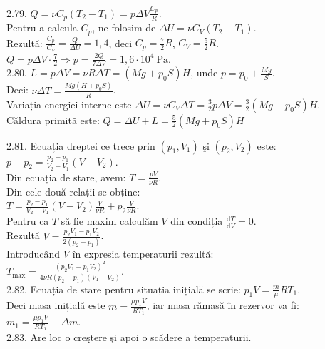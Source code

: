 2.79. $Q=\nu C_{p}\left(T_{2}-T_{1}\right)=p \Delta V \frac{C_{p}}{R}$.\\ Pentru a calcula $C_{p}$, ne folosim de $\Delta U=\nu C_{V}\left(T_{2}-T_{1}\right)$.\\ Rezultă: $\frac{C_{p}}{C_{V}}=\frac{Q}{\Delta U}=1,4$, deci $C_{p}=\frac{7}{2} R$, $C_{V}=\frac{5}{2} R$.\\ $Q=p \Delta V \cdot \frac{7}{2} \Rightarrow p=\frac{2 Q}{7 \Delta V}=1,6 \cdot 10^{4} \mathrm{~Pa}$.\\

2.80. $L=p \Delta V=\nu R \Delta T=\left(M g+p_{0} S\right) H$, unde $p=p_{0}+\frac{M g}{S}$.\\ Deci: $\nu \Delta T=\frac{M g\left(H+p_{0} S\right)}{R}$.\\ Variația energiei interne este $\Delta U=\nu C_{V} \Delta T=\frac{3}{2} p \Delta V=\frac{3}{2}\left(M g+p_{0} S\right) H$.\\ Căldura primită este: $Q=\Delta U+L=\frac{5}{2}\left(M g+p_{0} S\right) H$

2.81. Ecuația dreptei ce trece prin $\left(p_{1}, V_{1}\right)$ şi $\left(p_{2}, V_{2}\right)$ este:\\ $p-p_{2}=\frac{p_{2}-p_{1}}{V_{2}-V_{1}}\left(V-V_{2}\right)$.\\ Din ecuația de stare, avem: $T=\frac{p V}{\nu R}$.\\ Din cele două relații se obține:\\ $T=\frac{p_{2}-p_{1}}{V_{2}-V_{1}}\left(V-V_{2}\right) \frac{V}{\nu R}+p_{2} \frac{V}{\nu R}$.\\ Pentru ca $T$ să fie maxim calculăm $V$ din condiția $\frac{\mathrm{d} T}{\mathrm{d} V}=0$.\\ Rezultă $V=\frac{p_{2} V_{1}-p_{1} V_{2}}{2\left(p_{2}-p_{1}\right)}$.\\ Introducând $V$ în expresia temperaturii rezultă:\\ $T_{\max}=\frac{\left(p_{2} V_{1}-p_{1} V_{2}\right)^{2}}{4 \nu R\left(p_{2}-p_{1}\right)\left(V_{1}-V_{2}\right)}$.\\

2.82. Ecuația de stare pentru situația inițială se scrie: $p_{1} V=\frac{m}{\mu} R T_{1}$.\\ Deci masa inițială este $m=\frac{\mu p_{1} V}{R T_{1}}$, iar masa rămasă în rezervor va fì:\\ $m_{1}=\frac{\mu p_{1} V}{R T_{1}}-\Delta m$.\\

2.83. Are loc o creştere şi apoi o scădere a temperaturii.\\

